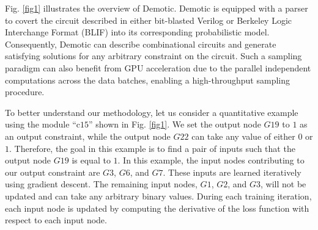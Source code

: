Fig. \ref{fig1} illustrates the overview of {\sc Demotic}. {\sc Demotic} is equipped with a parser to covert the circuit described in either bit-blasted Verilog or Berkeley Logic Interchange Format (BLIF) into its corresponding probabilistic model. Consequently, {\sc Demotic} can describe combinational circuits and generate satisfying solutions for any arbitrary constraint on the circuit. Such a sampling paradigm can also benefit from GPU acceleration due to the parallel independent computations across the data batches, enabling a high-throughput sampling procedure. 

To better understand our methodology, let us consider a quantitative example using the module ``c$15$'' shown in Fig. \ref{fig1}. We set the output node $G19$ to $1$ as an output constraint, while the output node $G22$ can take any value of either $0$ or $1$. Therefore, the goal in this example is to find a pair of inputs such that the output node $G19$ is equal to $1$. In this example, the input nodes contributing to our output constraint are $G3$, $G6$, and $G7$. These inputs are learned iteratively using gradient descent. The remaining input nodes, $G1$, $G2$, and $G3$, will not be updated and can take any arbitrary binary values. During each training iteration, each input node is updated by computing the derivative of the loss function with respect to each input node.

